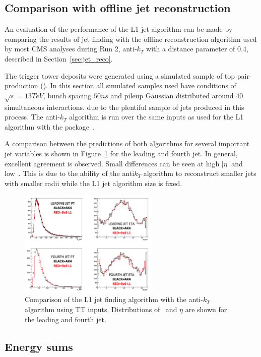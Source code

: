 \subsection{Comparison with offline jet reconstruction}

An evaluation of the performance of the L1 jet algorithm can be made by comparing
the results of jet finding with the offline reconstruction algorithm used by 
most CMS analyses during Run 2, anti-$k_T$ with a distance
parameter of 0.4, described in Section~\ref{sec:jet_reco}. 

The trigger tower deposits were generated using a simulated sample of 
top pair-production (\ttj). In this section all simulated samples used have conditions 
of $\sqrt{s} = 13TeV$, bunch spacing $50ns$ and pileup Gaussian distributed around $40$ simultaneous interactions.
due to the plentiful sample of jets produced in this process. The anti-$k_T$ algorithm is run over the same inputs as
used for the L1 algorithm with the \FASTJET package~\cite{fastjet}.

A comparison between the predictions of both algorithms for several important jet variables is shown in 
Figure~\ref{fig:jet_l1s2_compak4} for the leading and fourth jet. In general, excellent agreement is observed. 
Small differences can be seen at high $|\eta|$ and low~\pt. This is due to the ability 
of the anti$k_T$ algorithm to reconstruct smaller jets with smaller radii while the L1 jet
algorithm size is fixed.


\begin{figure}
\centering
    \includegraphics[width=0.6\textwidth]{./Figures/triggerUpgrade/jet_l1s2_compak4}
  \caption{Comparison of the L1 jet finding algorithm with the anti-$k_T$ algorithm using TT inputs. Distributions of \pt~and $\eta$ are shown for the leading and fourth
  jet.}
  \label{fig:jet_l1s2_compak4}
\end{figure}  
\subsection{Energy sums}

